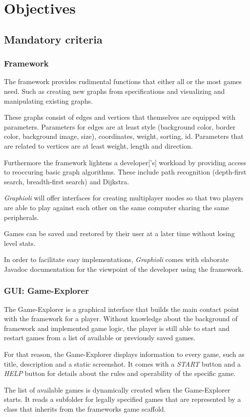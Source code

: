 \section{Objectives}
\subsection{Mandatory criteria}
\subsubsection{Framework}
The framework provides rudimental functions that either all or the most games need. Such as creating new graphs from specifications and visualizing and manipulating existing graphs.\par
These graphs consist of \glspl{edge} and \glspl{vertice} that themselves are equipped with parameters. Parameters for edges are at least style (background color, border color, background image, size), coordinates, weight, sorting, \Gls{id}. Parameters that are related to vertices are at least weight, length and direction.\par
Furthermore the framework lightens a \gls{developer}['s] workload by providing access to reoccuring basic graph algorithms. These include path recognition (depth-first search, breadth-first search) and Dijkstra.\par
\emph{Graphioli} will offer interfaces for creating multiplayer modes so that two \glspl{player} are able to play against each other on the same computer sharing the same peripherals.\par
Games can be saved and restored by their user at a later time without losing \gls{level} stats.\par
In order to facilitate easy implementations, \emph{Graphioli} comes with elaborate \Gls{Javadoc} documentation for the viewpoint of the developer using the framework.\par


\subsubsection{GUI: Game-Explorer}
The Game-Explorer is a graphical interface that builds the main contact point with the framework for a player. Without knowledge about the background of framework and implemented game logic, the player is still able to start and restart games from a list of available or previously saved games.\par
For that reason, the Game-Explorer displays information to every game, such as title, description and a static screenshot. It comes with a \emph{START} button and a \emph{HELP} button for details about the rules and operability of the specific game.\par
The list of available games is dynamically created when the Game-Explorer starts. It reads a subfolder for legally specified games that are represented by a class that inherits from the frameworks game scaffold.

